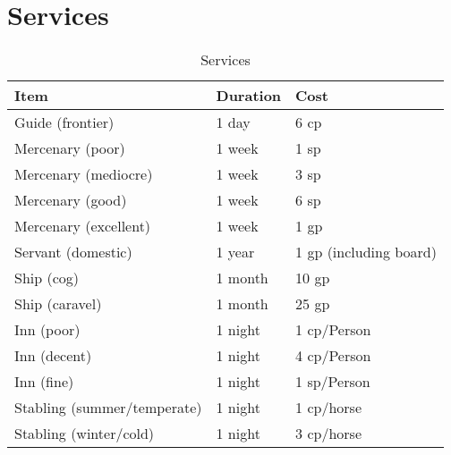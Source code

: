 \documentclass[oneside,11pt,english]{book}
\begin{document}
\section{Services}
\begin{table}[hb]
  \centering
  \caption{Services}
  \label{tab:Services}
  \begin{tabu} spread 0pt {*{3}{X[-1]}}
    Item                                 & Duration                                        & Cost                   \\\toprule
    Guide (frontier)                     & 1 day                                           & 6 cp                   \\
    Mercenary (poor)                     & 1 week                                          & 1 sp                   \\
    Mercenary (mediocre)                 & 1 week                                          & 3 sp                   \\
    Mercenary (good)                     & 1 week                                          & 6 sp                   \\
    Mercenary (excellent)                & 1 week                                          & 1 gp                   \\
    Servant (domestic)                   & 1 year                                          & 1 gp (including board) \\
    Ship (cog)                           & 1 month                                         & 10 gp                  \\
    Ship (caravel)                       & 1 month                                         & 25 gp                  \\
    Inn (poor)                           & 1 night                                         & 1 cp/Person            \\
    Inn (decent)                         & 1 night                                         & 4 cp/Person            \\
    Inn (fine)                           & 1 night                                         & 1 sp/Person            \\
    Stabling (summer/temperate)          & 1 night                                         & 1 cp/horse             \\
    Stabling (winter/cold)               & 1 night                                         & 3 cp/horse             \\
  \end{tabu}
\end{table}
\end{document}

